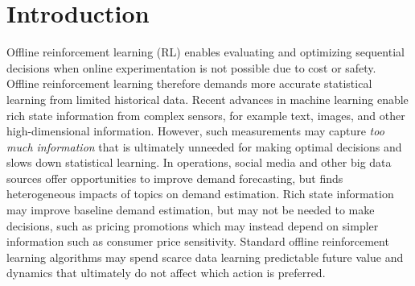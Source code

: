 \documentclass[opre,nonblindrev]{informs4}
\begin{document}

\maketitle

\section{Introduction}
Offline reinforcement learning (RL) enables evaluating and optimizing sequential decisions when online experimentation is not possible due to cost or safety. Offline reinforcement learning therefore demands more accurate statistical learning from limited historical data. Recent advances in machine learning enable rich state information from complex sensors, for example text, images, and other high-dimensional information. However, such measurements may capture \textit{too much information} that is ultimately unneeded for making optimal decisions and slows down statistical learning. In operations, social media and other big data sources offer opportunities to improve demand forecasting, but \citet{fu2023value} finds heterogeneous impacts of topics on demand estimation. Rich state information may improve baseline demand estimation, but may not be needed to make decisions, such as pricing promotions which may instead depend on simpler information such as consumer price sensitivity. Standard offline reinforcement learning algorithms may spend scarce data learning predictable future value and dynamics that ultimately do not affect which action is preferred.
\end{document}
